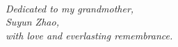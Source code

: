 
\renewcommand{\baselinestretch}{2}
\small\normalsize
\hbox{\ }
 
\vspace{.5in}

\begin{center}
\large{\textit{Dedicated to my grandmother,\\ 
       Suyun Zhao,\\
with love and everlasting remembrance.}}
\end{center} 


